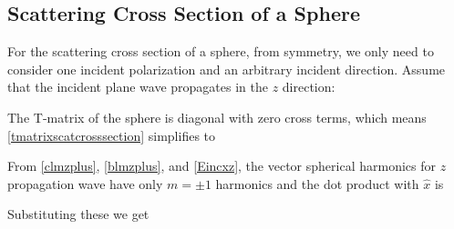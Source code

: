 \subsection{Scattering Cross Section of a Sphere}

For the scattering cross section of a sphere, from symmetry, we only need to consider one incident polarization and an arbitrary incident direction. Assume that the incident plane wave propagates in the $z$ direction:

The T-matrix of the sphere is diagonal with zero cross terms, which means \eqref{tmatrixscatcrosssection} simplifies to

From \eqref{clmzplus}, \eqref{blmzplus}, and \eqref{Eincxz}, the vector spherical harmonics for $z$ propagation wave have only $m=\pm1$ harmonics and the dot product with $\hat{x}$ is

Substituting these we get 

